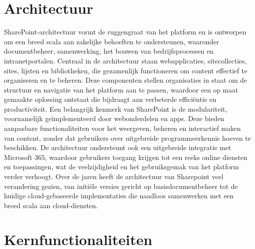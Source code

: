 \section{Architectuur}


SharePoint-architectuur vormt de ruggengraat van het platform en is ontworpen om een breed scala aan zakelijke behoeften te ondersteunen, waaronder documentbeheer, samenwerking, het bouwen van bedrijfsprocessen en intranetportalen. Centraal in de architectuur staan webapplicaties, sitecollecties, sites, lijsten en bibliotheken, die gezamenlijk functioneren om content effectief te organiseren en te beheren. Deze componenten stellen organisaties in staat om de structuur en navigatie van het platform aan te passen, waardoor een op maat gemaakte oplossing ontstaat die bijdraagt aan verbeterde efficiëntie en productiviteit. Een belangrijk kenmerk van SharePoint is de modulariteit, voornamelijk geïmplementeerd door webonderdelen en apps. Deze bieden aanpasbare functionaliteiten voor het weergeven, beheren en interactief maken van content, zonder dat gebruikers over uitgebreide programmeerkennis hoeven te beschikken. De architectuur ondersteunt ook een uitgebreide integratie met Microsoft 365, waardoor gebruikers toegang krijgen tot een reeks online diensten en toepassingen, wat de veelzijdigheid en het gebruiksgemak van het platform verder verhoogt. Over de jaren heeft de architectuur van Sharepoint veel verandering gezien, van initiële versies gericht op basisdocumentbeheer tot de huidige cloud-gebaseerde implementaties die naadloos samenwerken met een breed scala aan cloud-diensten. \autocite{Hu2023}
\section{Kernfunctionaliteiten}

